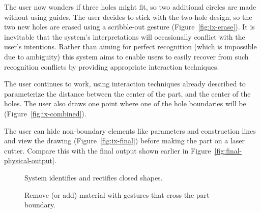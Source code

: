 \documentclass[12pt]{article}
\begin{document}
The user now wonders if three holes might fit, so two additional
circles are made without using guides. The user decides to stick with
the two-hole design, so the two new holes are erased using a
scribble-out gesture (Figure~\ref{fig:ix-erase}). It is inevitable
that the system's interpretations will occasionally conflict with the
user's intentions. Rather than aiming for perfect recognition (which
is impossible due to ambiguity) this system aims to enable users to
easily recover from such recognition conflicts by providing
appropriate interaction techniques.

The user continues to work, using interaction techniques already
described to parameterize the distance between the center of the part,
and the center of the holes. The user also draws one point where one
of the hole boundaries will be (Figure~\ref{fig:ix-combined}).

The user can hide non-boundary elements like parameters and
construction lines and view the drawing (Figure~\ref{fig:ix-final})
before making the part on a laser cutter. Compare this with the final
output shown earlier in Figure~\ref{fig:final-physical-output}.

\newpage
{}
\twocolumn

\begin{figure}[] 
\centering
{} 
\caption{System identifies and rectifies closed shapes.}
\label{fig:ix-draw-bounds}
\end{figure}

\begin{figure}[] 
\centering
{} 
\caption{Remove (or add) material with gestures that cross the part
  boundary.}
\label{fig:ix-remove-from-edge}
\end{figure}
\end{document}
